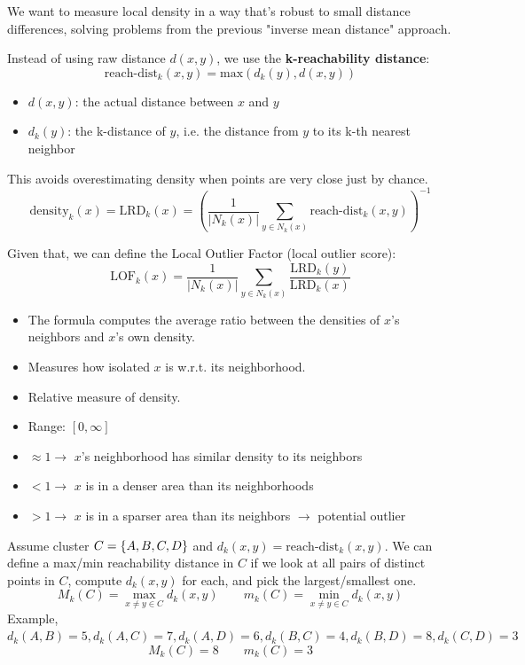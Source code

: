 \documentclass{article}
\begin{document}
We want to measure local density in a way that's robust to small distance differences, solving problems from the previous "inverse mean distance" approach.

Instead of using raw distance $d(x,y)$, we use the \textbf{k-reachability distance}:
\[
\text{reach-dist}_k(x,y) = \text{max}(d_k(y), d(x,y))
\]
\begin{itemize}
    \item $d(x,y)$: the actual distance between $x$ and $y$
    \item $d_k(y)$: the k-distance of $y$, i.e. the distance from $y$ to its k-th nearest neighbor
\end{itemize}
This avoids overestimating density when points are very close just by chance.
\[
\text{density}_k(x) = \text{LRD}_k(x) = \left( \frac{1}{|N_k(x)|} \sum_{y \in N_k(x)} \text{reach-dist}_k(x,y) \right)^{-1}
\]

Given that, we can define the Local Outlier Factor (local outlier score):
\[
\text{LOF}_k(x) = \frac{1}{|N_k(x)|} \sum_{y \in N_k(x)} \frac{\text{LRD}_k(y)}{\text{LRD}_k(x)}
\]
\begin{itemize}
    \item The formula computes the average ratio between the densities of $x$'s neighbors and $x$'s own density.
    \item Measures how isolated $x$ is w.r.t. its neighborhood.
    \item Relative measure of density.
    \item Range: $[0, \infty]$
    \item $\approx 1 \to$ $x$'s neighborhood has similar density to its neighbors
    \item $< 1 \to$ $x$ is in a denser area than its neighborhoods
    \item $>1 \to$ $x$ is in a sparser area than its neighbors $\to$ potential outlier
\end{itemize}

Assume cluster $C = \{A, B, C, D\}$ and $d_k(x,y) = \text{reach-dist}_k(x,y)$. We can define a max/min reachability distance in $C$ if we look at all pairs of distinct points in $C$, compute $d_k(x,y)$ for each, and pick the largest/smallest one.
\[
M_k(C) = \max_{x \neq y \in C}  d_k(x,y) \qquad m_k(C) = \min_{x \neq y \in C}  d_k(x,y)
\]
Example, $d_k(A, B) = 5,
d_k(A, C) = 7,
d_k(A, D) = 6,
d_k(B, C) = 4,
d_k(B, D) = 8,
d_k(C, D) = 3
$
\[
M_k(C) = 8 \qquad m_k(C) = 3
\]
\end{document}
